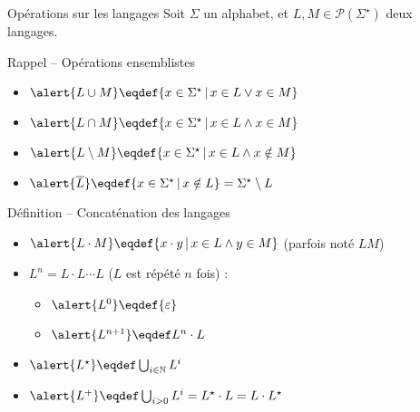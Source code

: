
\begingroup

\begin{frame}{Opérations sur les langages}
  Soit $\Sigma$ un alphabet, et $L, M \in \mathscr{P}(\Sigma^\star)$ deux langages. 
  
  \begin{block}{Rappel -- Opérations ensemblistes}
    \begin{itemize}
    \item\vspace{-1mm}  $\alert{L \cup M} \eqdef \{ x \in \Sigma^\star \,|\, x \in L \lor x \in M\}$
    \item\vspace{-1mm}  $\alert{L \cap M} \eqdef \{ x \in \Sigma^\star \,|\, x \in L \land x \in M\}$
    \item\vspace{-1mm}  $\alert{L \setminus M} \eqdef \{ x \in \Sigma^\star \,|\, x \in L \land x \notin M\}$
    \item\vspace{-1mm}  $\alert{\overline{L}} \eqdef \{ x \in \Sigma^\star \,|\, x \notin L\} = \Sigma^\star \setminus L$
    \end{itemize}
  \end{block}
  \begin{block}{Définition -- Concaténation des langages}
    \begin{itemize}
    \item\vspace{-.5mm}  $\alert{L \cdot M} \eqdef \{ x \cdot y \,|\, x \in L \land y \in M\}$ (parfois noté $LM$)
    \item {} $L^n = L\cdot L \cdots L$ ($L$ est répété $n$ fois) :
      \begin{itemize}
      \item\vspace{-.5mm} $\alert{L^0} \eqdef \{\varepsilon\}$
      \item\vspace{-.5mm} $\alert{L^{n+1}} \eqdef L^n \cdot L$
      \end{itemize}
    \item\vspace{-.5mm}  $\alert{L^\star} \eqdef \bigcup_{i\in \mathbb{N}} L^i$
    \item\vspace{-.5mm}  $\alert{L^+} \eqdef \bigcup_{i>0} L^i = L^\star \cdot L = L \cdot L^\star$
    \end{itemize}
  \end{block}
\end{frame}

\endgroup

